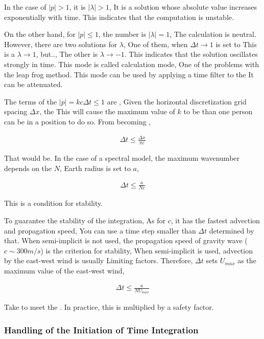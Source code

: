 In the case of \(|p|>1\), it is \(|\lambda| > 1\), It is a solution
whose absolute value increases exponentially with time. This indicates
that the computation is unstable.

On the other hand, for \(|p| \le 1\), the number is \(|\lambda| = 1\),
The calculation is neutral. However, there are two solutions for
\(\lambda\), One of them, when \(\Delta t \rightarrow 1\) is set to This
is a \(\lambda \rightarrow 1\), but.., The other is
\(\lambda \rightarrow -1\). This indicates that the solution oscillates
strongly in time. This mode is called calculation mode, One of the
problems with the leap frog method. This mode can be used by applying a
time filter to the It can be attenuated.

The terms of the \(|p|=kc \Delta t \le 1\) are , Given the horizontal
discretization grid spacing \(\Delta x\), the This will cause the
maximum value of \(k\) to be \More than one person can be in a position
to do so. From becoming ,

\begin{eqnarray}
   \Delta t \le \frac{\Delta x}{\pi c}
\end{eqnarray}

That would be. In the case of a spectral model, the maximum wavenumber
depends on the \(N\), Earth radius is set to \(a\),

\begin{eqnarray}
   \Delta t \le \frac{a}{N c}  
\end{eqnarray}

This is a condition for stability.

To guarantee the stability of the integration, As for \(c\), it has the
fastest advection and propagation speed, You can use a time step smaller
than \(\Delta t\) determined by that. When semi-implicit is not used,
the propagation speed of gravity wave (\(c \sim 300m/s\)) is the
criterion for stability, When semi-implicit is used, advection by the
east-west wind is usually Limiting factors. Therefore, \(\Delta t\) sets
\(U_{max}\) as the maximum value of the east-west wind,

\begin{eqnarray}
   \Delta t \le \frac{a}{N U_{max}}  
\end{eqnarray}

Take to meet the . In practice, this is multiplied by a safety factor.

\hypertarget{handling-of-the-initiation-of-time-integration}{%
\subsubsection{Handling of the Initiation of Time
Integration}\label{handling-of-the-initiation-of-time-integration}}

